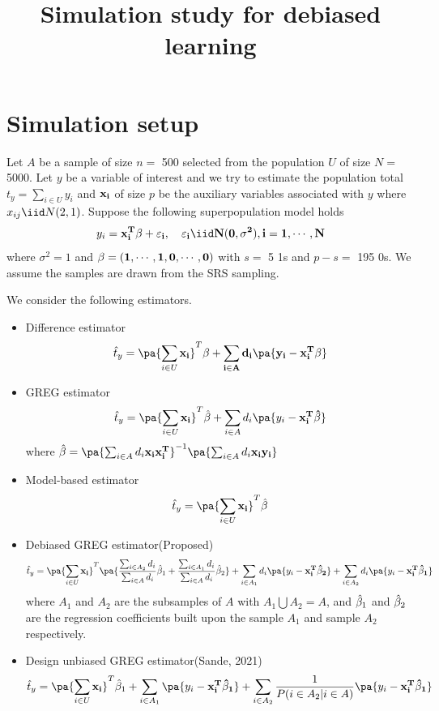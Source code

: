 \documentclass[
]{article}
\title{Simulation study for debiased learning}
\author{}
\date{\vspace{-2.5em}}
\begin{document}
\maketitle

\hypertarget{simulation-setup}{%
\section{Simulation setup}\label{simulation-setup}}

Let \(A\) be a sample of size \(n =\) 500 selected from the population
\(U\) of size \(N =\) 5000. Let \(y\) be a variable of interest and we
try to estimate the population total \(t_y = \sum_{i \in U} y_i\) and
\(\bf x_{i}\) of size \(p\) be the auxiliary variables associated with
\(y\) where \(x_{ij} \iid N(2, 1)\). Suppose the following
superpopulation model holds \[
y_i = \bf x_i^T \bf \beta + \varepsilon_i, \quad \varepsilon_i \iid N(0,\sigma^2), i = 1, \cdots, N
\] where \(\sigma^2 = 1\) and
\(\bf \beta = (1, \cdots, 1, 0, \cdots, 0)\) with \(s =\) 5 1s and
\(p - s =\) 195 0s. We assume the samples are drawn from the SRS
sampling.

We consider the following estimators.

\begin{itemize}
  \item Difference estimator
  $$
  \hat t_y = \pa{\sum_{i \in U}\bf x_i}^T \bf \beta + \sum_{i \in A} d_i \pa{y_i - \bf x_i^T \bf \beta}
  $$
  \item GREG estimator
  $$
  \hat t_y = \pa{\sum_{i \in U}\bf x_i}^T \hat{\bf \beta} + \sum_{i \in A} d_i \pa{y_i - \bf x_i^T \hat{\bf \beta}}
  $$
  where $\hat {\bf \beta} = \pa{\sum_{i \in A} d_i \bf x_i \bf x_i^T}^{-1} \pa{\sum_{i \in A} d_i \bf x_i y_i}$
  
  \item Model-based estimator
  $$
  \hat t_y = \pa{\sum_{i \in U}\bf x_i}^T \hat{\bf \beta}
  $$
  
  \item Debiased GREG estimator(Proposed)
    $$
  \hat t_y = \pa{\sum_{i \in U}\bf x_i}^T \pa{ \frac{\sum_{i \in A_2}d_i}{\sum_{i \in A}d_i} \hat{\bf \beta}_1 + \frac{\sum_{i \in A_1}d_i}{\sum_{i \in A}d_i} \hat{\bf \beta}_2} + \sum_{i \in A_1} d_i \pa{y_i - \bf x_i^T \hat{\bf \beta}_2} + \sum_{i \in A_2} d_i \pa{y_i - \bf x_i^T \hat{\bf \beta}_1}
  $$
  where $A_1$ and $A_2$ are the subsamples of $A$ with $A_1 \bigcup A_2 = A$, and $\hat {\bf \beta}_1$ and $\hat {\bf \beta}_2$ are the regression coefficients built upon the sample $A_1$ and sample $A_2$ respectively.
  \item Design unbiased GREG estimator(Sande, 2021)
  $$
  \hat t_y = \pa{\sum_{i \in U}\bf x_i}^T \hat{\bf \beta}_1 + \sum_{i \in A_1} \pa{y_i - \bf x_i^T \hat{\bf \beta}_1} + \sum_{i \in A_2} \frac{1}{P(i \in A_2 | i \in A)} \pa{y_i - \bf x_i^T \hat{\bf \beta}_1}
  $$
  
\end{itemize}
\end{document}
